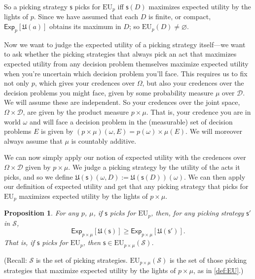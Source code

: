 \documentclass[a4paper]{article}
\newtheorem{proposition}[theorem]{Proposition}
\newcommand\Exp{\mathsf{Exp}}
\newcommand\EU{\mathrm{EU}}
\newcommand\U{\mathfrak{U}} %
\newcommand{\D}{\mathcal{D}}
\renewcommand\S{\mathcal{S}}
\newcommand\s{\mathsf{s}}
\newcommand{\todoold}[2][]{\todo[backgroundcolor=white,bordercolor=orange!10,linecolor=gray!10, #1,caption={},textcolor=gray]{Pre-rev: #2}}
\newcommand{\Strategies}{\S}
\renewcommand{\emptyset}{\varnothing}
\renewcommand{\geq}{\geqslant}
\newenvironment{CCM rewritten}
{\begingroup\color{blue}} %
{\endgroup}              %
\begin{document}

So a picking strategy $\s$ picks for $\EU_p$ iff $\s(D)$ maximizes expected utility by the lights of $p$.
Since we have assumed that each $D$ is finite, or compact, $\Exp_p[\U(a)]$ obtains its maximum in $D$; so $\EU_p(D)\neq\emptyset$. 

Now we want to judge the expected utility of a picking strategy itself---we want to ask whether the picking strategies that always pick an act that maximizes expected utility from any decision problem themselves maximize expected utility when you're uncertain which decision problem you'll face. This requires us to fix not only $p$, which gives your credences over $\Omega$, but also your credences over the decision problems you might face, given by some probability measure $\mu$ over $\D$. We will assume these are independent. %
{So your credences over the joint space, $\Omega\times\D$, are given by the product measure $p\times\mu$. That is, your credence you are in world $\omega$ and will face a decision problem in the (measurable) set of decision problems $E$ is given by $(p\times\mu)(\omega,E)=p(\omega)\times\mu(E)$.} 
We will moreover always assume that $\mu$ is countably additive. 


We can now simply apply our notion of expected utility with the credences over $\Omega\times\D$ given by %
{$p\times\mu$.} We judge a picking strategy by the utility of the acts it picks, and so we define $\U(\s)(\omega,D):=\U(\s(D))(\omega)$. We can then apply our definition of expected utility and get that any picking strategy that picks for $\EU_p$ maximizes expected utility by the lights of %
{ $p\times\mu$.}
\begin{proposition}\label{thm:eu-self-rec}
	For any $p$, $\mu$, if $\s$ picks for $\EU_p$, then, for any picking strategy $\s'$ in $\S$,
	$$\Exp_{p\times\mu}[\U(\s)]\geq\Exp_{p\times\mu}[\U(\s')].$$
	That is, if $\s$ picks for $\EU_p$, then $\s\in\EU_{p\times\mu}(\Strategies)$. 
	\end{proposition}
(Recall: 
$\Strategies$ is the set of picking strategies. $\EU_{p\times \mu}(\Strategies)$ is the set of those picking strategies that maximize expected utility by the lights of %
{$p\times\mu$}, as in \cref{def:EU}.)
\end{document}
